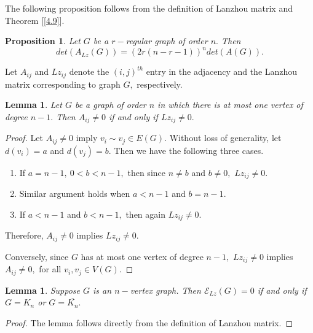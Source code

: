 \documentclass[10pt,a4paper,oneside]{article}
\newtheorem{lemma}[theorem]{Lemma}
\newtheorem{proposition}[theorem]{Proposition}
\begin{document}
The following proposition follows from the definition of Lanzhou matrix and Theorem [\ref{4.9}].
\begin{proposition}
Let $G$ be a $r-$regular graph of order $n.$ Then $$det(A_{Lz}(G))=(2r(n-r-1))^n det(A(G)).$$
\end{proposition}
Let $A_{ij}$ and $Lz_{ij}$ denote the $(i,j)^{th}$ entry in the adjacency and the Lanzhou matrix corresponding to graph $G,$ respectively.
\begin{lemma}\label{4.11}
Let $G$ be a graph of order $n$ in which there is at most one vertex of degree $n-1.$ Then $A_{ij}\neq 0$ if and only if $Lz_{ij}\neq 0.$
\end{lemma}
\begin{proof}
Let $A_{ij}\neq 0$ imply $v_i\sim v_j\in E(G).$ Without loss of generality, let $d(v_i)=a$ and $d(v_j)=b.$ Then we have the following three cases.
\begin{enumerate}
\item If $a=n-1,\ 0< b<n-1,$ then since $n\neq b$ and $b\neq 0,$ $Lz_{ij}\neq 0.$
\item Similar argument holds when $a<n-1$ and $b=n-1.$
\item If $a<n-1$ and $b<n-1,$ then again $Lz_{ij}\neq 0.$
\end{enumerate}
Therefore, $A_{ij}\neq 0$ implies $Lz_{ij}\neq 0.$
    

Conversely, since $G$ has at most one vertex of degree $n-1,$ $Lz_{ij}\neq 0$ implies $A_{ij}\neq 0,$ for all $v_i,v_j\in V(G).$
\end{proof}
\begin{lemma}
Suppose $G$ is an $n-$vertex graph. Then $\mathcal{E}_{Lz}(G)=0$ if and only if $G=K_n$ or $G=\overline{K_n}.$
\end{lemma}
\begin{proof}
The lemma follows directly from the definition of Lanzhou matrix.
\end{proof}
\end{document}
